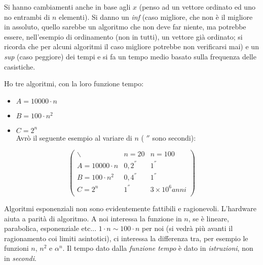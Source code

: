 \documentclass[a4paper,12pt,oneside,tikz]{book}
\begin{document}
Si hanno cambiamenti anche in base agli $x$ (penso ad un vettore ordinato ed uno no entrambi di $n$ elementi). Si danno un \textit{inf} (caso migliore, che non è il migliore in assoluto, quello sarebbe un algoritmo che non deve far niente, ma potrebbe essere, nell'esempio di ordinamento (non in tutti), un vettore già ordinato; si ricorda che per alcuni algoritmi il caso migliore potrebbe non verificarsi mai) e un \textit{sup} (caso peggiore) dei tempi e si fa un tempo medio basato sulla frequenza delle casistiche.\\
\begin{esempio}
	Ho tre algoritmi, con la loro funzione tempo:
	\begin{itemize}
		\item $A=10000\cdot n$
		\item $B=100\cdot n^2$
		\item $C=2^n$\\
		      Avrò il seguente esempio al variare di $n$ ( $''$ sono secondi):
	\end{itemize}
	$$\left(\begin{matrix}
			\backslash     & n=20     & n=100               \\
			A=10000\cdot n & 0,2^{''} & 1^{''}              \\
			B=100\cdot n^2 & 0,4^{''} & 1^{''}              \\
			C=2^n          & 1^{''}   & 3\times 10^{6} anni \\
		\end{matrix}\right)$$
\end{esempio}
Algoritmi esponenziali non sono evidentemente fattibili e ragionevoli.
\newpage
L'hardware aiuta a parità di algoritmo.
A noi interessa la funzione in $n$, se è lineare, parabolica, esponenziale etc... $1\cdot n\sim 100\cdot n$ per noi (si vedrà più avanti il ragionamento coi limiti asintotici), ci interessa la differenza tra, per esempio le funzioni $n$, $n^2$ e $\alpha^n$. Il tempo dato dalla \textit{funzione tempo} è dato in \textit{istruzioni}, non in \textit{secondi}.\\
\end{document}
